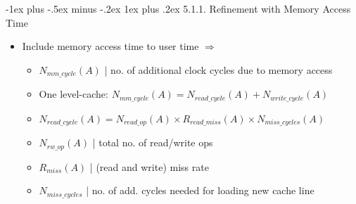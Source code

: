 \documentclass[10pt,landscape]{article}
\makeatletter
\newcommand{\subsubsubsection}{\@startsection{subsubsection}{3}{0mm}%
                                {-1ex plus -.5ex minus -.2ex}%
                                {1ex plus .2ex}%
                                {\normalfont\scriptsize\bfseries}}
\makeatother
\begin{document}
\begin{multicols*}{3}
\subsubsubsection{5.1.1. Refinement with Memory Access Time}
\begin{itemize}[topsep=0pt,noitemsep,wide=0pt, leftmargin=\dimexpr{} + 2\relax]
    \item Include memory access time to user time $\Rightarrow$ \noindent{}
    \begin{itemize}[topsep=0pt,noitemsep,wide=0pt, leftmargin=\dimexpr{} + 2\relax]
        \item $N_{mm\_cycle}(A)$ | no. of additional clock cycles due to memory access
        \item One level-cache: $N_{mm\_cycle}(A) = N_{read\_cycle}(A) + N_{write\_cycle}(A)$
        \item $N_{read\_cycle}(A) = N_{read\_op}(A) \times R_{read\_miss}(A) \times N_{miss\_cycles}(A)$
    \end{itemize}
    \begin{itemize}[topsep=0pt,noitemsep,wide=0pt, leftmargin=\dimexpr{} + 2\relax]
        \item $N_{rw\_op}(A)$ | total no. of read/write ops
        \item $R_{miss}(A)$ | (read and write) miss rate
        \item $N_{miss\_cycles}$ | no. of add. cycles needed for loading new cache line
    \end{itemize}    
\end{itemize}


\end{multicols*}
\end{document}
